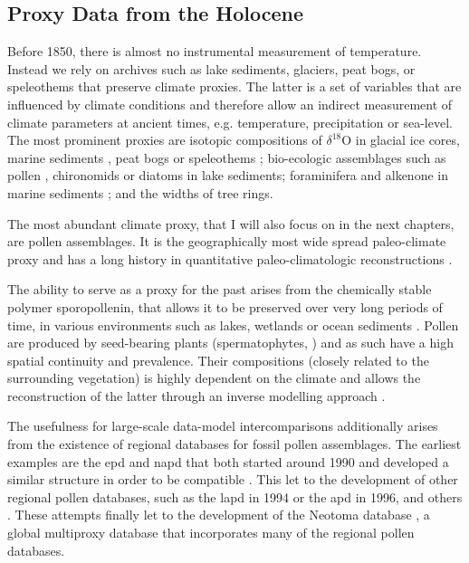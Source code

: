 \begin{refsection}
\subsection{Proxy Data from the Holocene}  \label{sec:intro-paleo-data}
Before 1850, there is almost no instrumental measurement of temperature. Instead we rely on archives such as lake sediments, glaciers, peat bogs, or speleothems that preserve climate proxies. The latter is a set of variables that are influenced by climate conditions and therefore allow an indirect measurement of climate parameters at ancient times, e.g. temperature, precipitation or sea-level. The most prominent proxies are isotopic compositions of $\delta^{18}$O in glacial ice cores\addref, marine sediments \addref, peat bogs \addref or speleothems \addref; bio-ecologic assemblages such as pollen \addref, chironomids \addref or diatoms \addref in lake sediments; foraminifera and alkenone in marine sediments \addref; and the widths of tree rings.

The most abundant climate proxy, that I will also focus on in the next chapters, are pollen assemblages. It is the  geographically most wide spread paleo-climate proxy \citep{BirksBirks1980}  and has a long history in quantitative paleo-climatologic reconstructions \citep[e.g.][]{Nichols1967, Nichols1969, Bradley1985}.

The ability to serve as a proxy for the past arises from the chemically stable polymer sporopollenin, that allows it to be preserved over very long periods of time, in various environments such as lakes, wetlands or ocean sediments  \citep{FaegriKalandKrzywinski1989, Havinga1967}. Pollen are produced by seed-bearing plants (spermatophytes, \cite{Wodehouse1935} ) and as such have a high spatial continuity and prevalence. Their compositions (closely related to the surrounding vegetation) is highly dependent on the climate and allows the reconstruction of the latter through an inverse modelling approach \citep{JugginsBirks2012,Juggins2013,BrewerGuiotBarboni2007}.

The usefulness for large-scale data-model intercomparisons additionally arises from the existence of regional databases for fossil pollen assemblages. The earliest examples are the \gls{epd} and \gls{napd}  that both started around 1990 and developed a similar structure in order to be compatible \citep{Grimm2008, FyfeBeaulieuBinneyEtAl2009} . This let to the development of other regional pollen databases, such as the \gls{lapd} \citep[LAPD, ][]{FlantuaHooghiemstraGrimmEtAl2015, MarchantAlmeidaBehlingEtAl2002} in 1994 or the \gls{apd} \citep{VincensLezineBuchetEtAl2007} in 1996, and others \citep[see][]{Grimm2008}. These attempts finally let to the development of the Neotoma database \citep{WilliamsGrimmBloisEtAl2018}, a global multiproxy database that incorporates many of the regional pollen databases.


\end{refsection}
